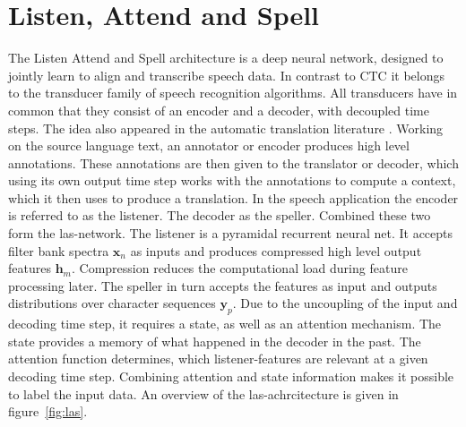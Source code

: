 \section{Listen, Attend and Spell \cite{Chan2015}}
The Listen Attend and Spell architecture is a deep neural network, designed to jointly learn to align and transcribe speech data. In contrast to CTC it belongs to the transducer family of speech recognition algorithms. All transducers have in common that they consist of an encoder and a decoder, with decoupled time steps. The idea also appeared in the automatic translation literature \cite{Bahdanau2015}. Working on the source language text, an annotator or encoder produces high level annotations. These annotations are then given to the translator or decoder, which using its own output time step works with the annotations to compute a context, which it then uses to produce a translation.
In the speech application the encoder is referred to as the listener. The decoder as the speller. Combined these two form the las-network. The listener is a pyramidal recurrent neural net. It accepts filter bank spectra $\mathbf{x}_n$ as inputs and produces compressed high level output features $\mathbf{h}_m$. Compression reduces the computational load during feature processing later.
The speller in turn accepts the features as input and outputs distributions over character sequences $\mathbf{y}_p$. Due to the uncoupling of the input and decoding time step, it requires a state, as well as an attention mechanism. The state provides a memory of what happened in the decoder in the past. The attention function determines, which listener-features are relevant at a given decoding time step. Combining attention and state information makes it possible to label the input data. An overview of the las-achrcitecture is given in figure~\ref*{fig:las}.


